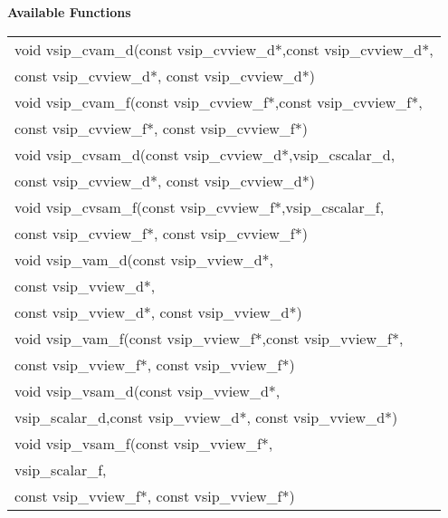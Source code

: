 \\\cvsiplh
\\ \hspace*{.8cm} \vspace*{.1cm} \textbf{Available Functions }
\\ \hspace*{1.1cm} {
\ttfamily
\begin{tabular}[H]{l}
void vsip\_cvam\_d(const vsip\_cvview\_d*,const vsip\_cvview\_d*, \\*\hspace{.7cm}const vsip\_cvview\_d*, const vsip\_cvview\_d*)\\
void vsip\_cvam\_f(const vsip\_cvview\_f*,const vsip\_cvview\_f*, \\*\hspace{.7cm}const vsip\_cvview\_f*, const vsip\_cvview\_f*)\\
void vsip\_cvsam\_d(const vsip\_cvview\_d*,vsip\_cscalar\_d, \\*\hspace{.7cm}const vsip\_cvview\_d*, const vsip\_cvview\_d*)\\
void vsip\_cvsam\_f(const vsip\_cvview\_f*,vsip\_cscalar\_f, \\*\hspace{.7cm}const vsip\_cvview\_f*, const vsip\_cvview\_f*)\\
void vsip\_vam\_d(const vsip\_vview\_d*,\\*\hspace{.7cm}const vsip\_vview\_d*,\\*\hspace{.7cm}const vsip\_vview\_d*, const vsip\_vview\_d*)\\
void vsip\_vam\_f(const vsip\_vview\_f*,const vsip\_vview\_f*,\\*\hspace{.7cm}const vsip\_vview\_f*, const vsip\_vview\_f*)\\
void vsip\_vsam\_d(const vsip\_vview\_d*,\\*\hspace{.7cm}vsip\_scalar\_d,const vsip\_vview\_d*, const vsip\_vview\_d*)\\
void vsip\_vsam\_f(const vsip\_vview\_f*,\\*\hspace{.7cm}vsip\_scalar\_f,\\*\hspace{.7cm}const vsip\_vview\_f*, const vsip\_vview\_f*)\\
\end{tabular}
}
